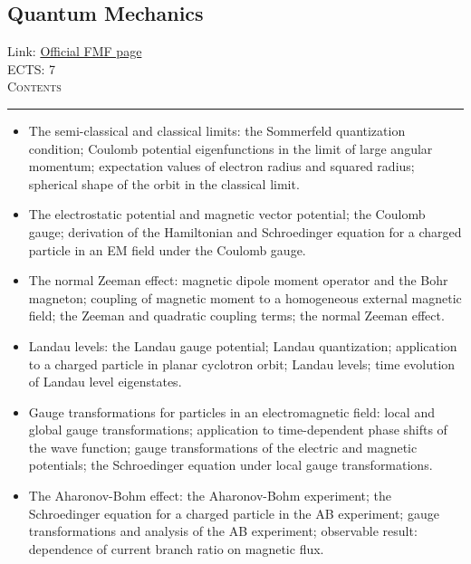 \documentclass[11pt, a4paper]{article}
\newenvironment{course}[3]{
\subsection{#1}%
Link: \href{#2}{Official FMF page}\\%
ECTS: #3%
\vspace{1ex}
\\
{\large \textsc{Contents}}\\[-0.9ex]%
\rule{\textwidth}{0.5pt}
\vspace{-3ex}
}
{}
\newenvironment{chapter}[1]{
\begin{tcolorbox}[title=#1, breakable]
}
{\end{tcolorbox}}
\begin{document}
\begin{course}{Quantum Mechanics}{https://www.fmf.uni-lj.si/en/study-physics/programmes/1fiz/2020/7000777/courses/1156/}{7}
\begin{chapter}{The central potential}
\begin{itemize}
            \item The semi-classical and classical limits: the Sommerfeld quantization condition; Coulomb potential eigenfunctions in the limit of large angular momentum; expectation values of  electron radius and squared radius; spherical shape of the orbit in the classical limit.
            
            
        \end{itemize}
    \end{chapter}

    \begin{chapter}{The charged particle in an electromagnetic field}

        \begin{itemize}
        
            \item The electrostatic potential and magnetic vector potential; the Coulomb gauge; derivation of the Hamiltonian and Schroedinger equation for a charged particle in an EM field under the Coulomb gauge.

            \item The normal Zeeman effect: magnetic dipole moment operator and the Bohr magneton; coupling of magnetic moment to a homogeneous external magnetic field; the Zeeman and quadratic coupling terms; the normal Zeeman effect.

            \item Landau levels: the Landau gauge potential; Landau quantization; application to a charged particle in planar cyclotron orbit; Landau levels; time evolution of Landau level eigenstates.

            \item Gauge transformations for particles in an electromagnetic field: local and global gauge transformations; application to time-dependent phase shifts of the wave function; gauge transformations of the electric and magnetic potentials; the Schroedinger equation under local gauge transformations.

            \item The Aharonov-Bohm effect: the Aharonov-Bohm experiment; the Schroedinger equation for a charged particle in the AB experiment; gauge transformations and analysis of the AB experiment; observable result: dependence of current branch ratio on magnetic flux.
        
        \end{itemize}
    \end{chapter}


\end{course}
\end{document}

